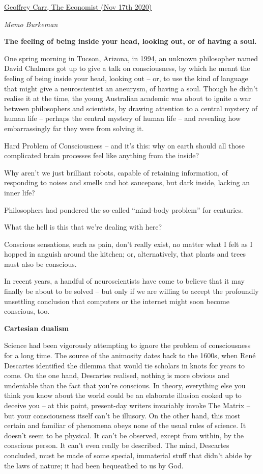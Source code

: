 \documentclass[
]{book}
\begin{document}
\href{https://www.economist.com/the-world-ahead/2020/11/17/two-rival-theories-of-consciousness-are-put-to-the-test}{Geoffrey Carr, The Economist (Nov 17th 2020)}

\emph{Memo Burkeman}

\textbf{The feeling of being inside your head, looking out, or of having a soul.}

One spring morning in Tucson, Arizona, in 1994, an unknown philosopher named David Chalmers got up to give a talk on consciousness, by which he meant the feeling of being inside your head, looking out -- or, to use the kind of language that might give a neuroscientist an aneurysm, of having a soul. Though he didn't realise it at the time, the young Australian academic was about to ignite a war between philosophers and scientists, by drawing attention to a central mystery of human life -- perhaps the central mystery of human life -- and revealing how embarrassingly far they were from solving it.

Hard Problem of Consciousness -- and it's this: why on earth should all those complicated brain processes feel like anything from the inside?

Why aren't we just brilliant robots, capable of retaining information, of responding to noises and smells and hot saucepans, but dark inside, lacking an inner life?

Philosophers had pondered the so-called ``mind-body problem'' for centuries.

What the hell is this that we're dealing with here?

Conscious sensations, such as pain, don't really exist, no matter what I felt as I hopped in anguish around the kitchen; or, alternatively, that plants and trees must also be conscious.

In recent years, a handful of neuroscientists have come to believe that it may finally be about to be solved -- but only if we are willing to accept the profoundly unsettling conclusion that computers or the internet might soon become conscious, too.

\textbf{Cartesian dualism}

Science had been vigorously attempting to ignore the problem of consciousness for a long time. The source of the animosity dates back to the 1600s, when René Descartes identified the dilemma that would tie scholars in knots for years to come. On the one hand, Descartes realised, nothing is more obvious and undeniable than the fact that you're conscious. In theory, everything else you think you know about the world could be an elaborate illusion cooked up to deceive you -- at this point, present-day writers invariably invoke The Matrix -- but your consciousness itself can't be illusory. On the other hand, this most certain and familiar of phenomena obeys none of the usual rules of science. It doesn't seem to be physical. It can't be observed, except from within, by the conscious person. It can't even really be described. The mind, Descartes concluded, must be made of some special, immaterial stuff that didn't abide by the laws of nature; it had been bequeathed to us by God.
\end{document}
